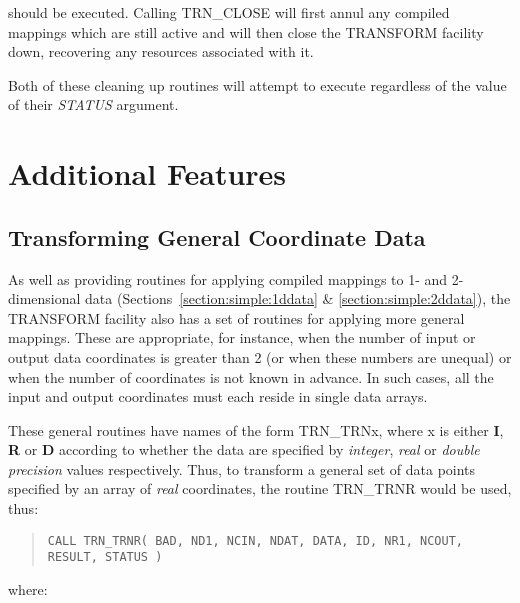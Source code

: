 \documentclass[twoside,11pt]{article}
\newcommand{\xlabel}[1]{}
\newcommand{\name}[1]{\mbox{\small{#1}}}
\newcommand{\fortvar}[1]{\mbox{\emph{#1}}}
\begin{document}
should be executed.
Calling \name{TRN\_CLOSE} will first annul any compiled mappings which are
still active and will then close the \name{TRANSFORM} facility down,
recovering any resources associated with it. 

Both of these cleaning up routines will attempt to execute regardless of the
value of their \fortvar{STATUS} argument. 


\section{\xlabel{additional_features}Additional Features}

\subsection{\xlabel{transforming_general_coordinate_data}Transforming General Coordinate Data}

\label{section:additional:generaldata}

As well as providing routines for applying compiled mappings to 1- and
2-dimensional data (Sections~\ref{section:simple:1ddata} \&
\ref{section:simple:2ddata}), the \name{TRANSFORM} facility also has a set
of routines for applying more general mappings. 
These are appropriate, for instance, when the number of input or output data
coordinates is greater than 2 (or when these numbers are unequal) or when
the number of coordinates is not known in advance. 
In such cases, all the input and output coordinates must each reside in
single data arrays. 

These general routines have names of the form \name{TRN\_TRNx}, where x is
either \textbf{I}, \textbf{R} or \textbf{D} according to whether the data are
specified by \emph{integer}, \emph{real} or \emph{double precision} values
respectively. 
Thus, to transform a general set of data points specified by an array of
{\em real} coordinates, the routine \name{TRN\_TRNR} would be used, thus:

\begin{quote}\small
\begin{verbatim}
CALL TRN_TRNR( BAD, ND1, NCIN, NDAT, DATA, ID, NR1, NCOUT, RESULT, STATUS )
\end{verbatim}
\end{quote}

where:
\end{document}
